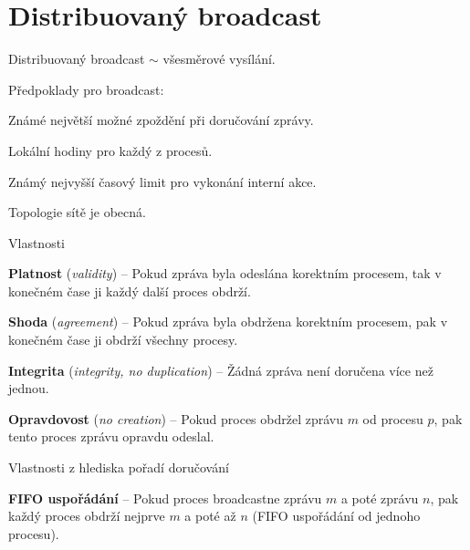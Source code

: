 
\section{Distribuovaný broadcast}


\begin{compactitem}
    \item Distribuovaný broadcast $\sim$ všesměrové vysílání.

    \item Předpoklady pro broadcast: \begin{compactitem}
        \item Známé největší možné zpoždění při doručování zprávy.
        \item Lokální hodiny pro každý z procesů.
        \item Známý nejvyšší časový limit pro vykonání interní akce.
        \item Topologie sítě je obecná.
    \end{compactitem}

    \item Vlastnosti \begin{compactitem}
        \item \textbf{Platnost} (\textit{validity}) -- Pokud zpráva byla odeslána korektním procesem, tak v konečném čase ji každý další proces obdrží.

        \item \textbf{Shoda} (\textit{agreement}) -- Pokud zpráva byla obdržena korektním procesem, pak v konečném čase ji obdrží všechny procesy.

        \item \textbf{Integrita} (\textit{integrity, no duplication}) -- Žádná zpráva není doručena více než jednou.

        \item \textbf{Opravdovost} (\textit{no creation}) -- Pokud proces obdržel zprávu $m$ od procesu $p$, pak tento proces zprávu opravdu odeslal.
    \end{compactitem}

    \item Vlastnosti z hlediska pořadí doručování \begin{compactitem}
        \item \textbf{FIFO uspořádání} -- Pokud proces broadcastne zprávu $m$ a poté zprávu $n$, pak každý proces obdrží nejprve $m$ a poté až $n$ (FIFO uspořádání od jednoho procesu).


\end{compactitem}
\end{compactitem}
